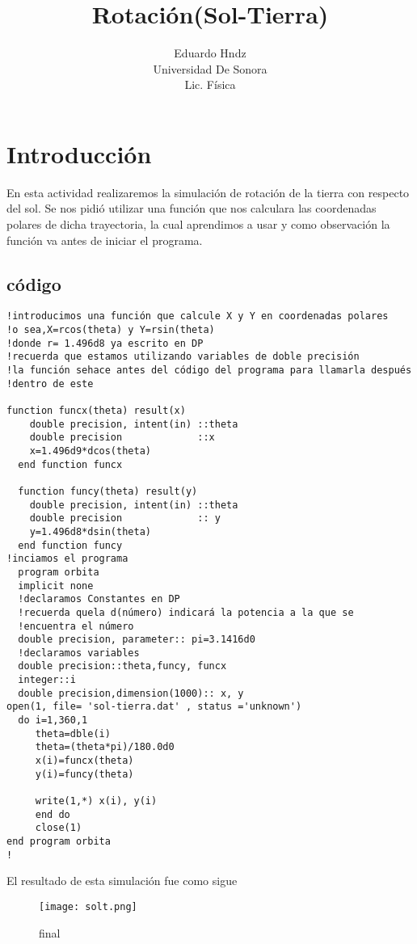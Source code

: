 \documentclass{article}
\title{Rotación(Sol-Tierra)}
\author{Eduardo Hndz\\Universidad De Sonora\\Lic. Física}
\begin{document}
\maketitle
\section{Introducción}
En esta actividad realizaremos la simulación de rotación de la tierra con respecto del sol.
Se nos pidió utilizar una función que nos calculara las coordenadas polares de dicha trayectoria, la cual aprendimos a usar y como observación la función va antes de iniciar el programa.

\subsection{código}
\begin{verbatim}
!introducimos una función que calcule X y Y en coordenadas polares
!o sea,X=rcos(theta) y Y=rsin(theta)
!donde r= 1.496d8 ya escrito en DP
!recuerda que estamos utilizando variables de doble precisión
!la función sehace antes del código del programa para llamarla después
!dentro de este

function funcx(theta) result(x)
    double precision, intent(in) ::theta
    double precision             ::x
    x=1.496d9*dcos(theta)
  end function funcx

  function funcy(theta) result(y)
    double precision, intent(in) ::theta
    double precision             :: y
    y=1.496d8*dsin(theta)
  end function funcy
!inciamos el programa
  program orbita
  implicit none
  !declaramos Constantes en DP
  !recuerda quela d(número) indicará la potencia a la que se
  !encuentra el número
  double precision, parameter:: pi=3.1416d0 
  !declaramos variables
  double precision::theta,funcy, funcx
  integer::i
  double precision,dimension(1000):: x, y
open(1, file= 'sol-tierra.dat' , status ='unknown')
  do i=1,360,1
     theta=dble(i)
     theta=(theta*pi)/180.0d0
     x(i)=funcx(theta)
     y(i)=funcy(theta)
     
     write(1,*) x(i), y(i)
     end do
     close(1)
end program orbita 
!
\end{verbatim}
El resultado de esta simulación fue como sigue
\begin{figure}[h!]
  \texttt{[image: solt.png]}
  \caption{final}
  \label{fig:boat1}
  \end{figure}
\end{document}
